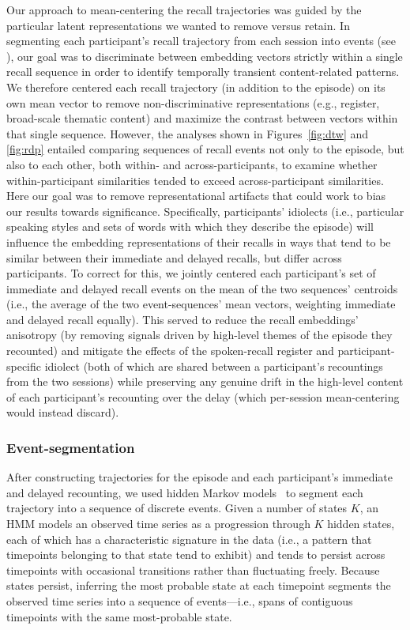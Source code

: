 \documentclass[10pt]{article}
\renewcommand{\nameref}[1]{\textit{\oldnameref{#1}}}
\begin{document}
Our approach to mean-centering the recall trajectories was guided by the particular latent representations we wanted to remove versus retain.
In segmenting each participant's recall trajectory from each session into events (see \nameref{subsec:eventseg}), our goal was to discriminate between embedding vectors strictly within a single recall sequence in order to identify temporally transient content-related patterns.
We therefore centered each recall trajectory (in addition to the episode) on its own mean vector to remove non-discriminative representations (e.g., register, broad-scale thematic content) and maximize the contrast between vectors within that single sequence.
However, the analyses shown in Figures~\ref{fig:dtw} and \ref{fig:rdp} entailed comparing sequences of recall events not only to the episode, but also to each other, both within- and across-participants, to examine whether within-participant similarities tended to exceed across-participant similarities. 
Here our goal was to remove representational artifacts that could work to bias our results towards significance.
Specifically, participants' idiolects (i.e., particular speaking styles and sets of words with which they describe the episode) will influence the embedding representations of their recalls in ways that tend to be similar between their immediate and delayed recalls, but differ across participants.
To correct for this, we jointly centered each participant's set of immediate and delayed recall events on the mean of the two sequences' centroids (i.e., the average of the two event-sequences' mean vectors, weighting immediate and delayed recall equally). 
This served to reduce the recall embeddings' anisotropy (by removing signals driven by high-level themes of the episode they recounted) and mitigate the effects of the spoken-recall register and participant-specific idiolect (both of which are shared between a participant's recountings from the two sessions) while preserving any genuine drift in the high-level content of each participant's recounting over the delay (which per-session mean-centering would instead discard).


\subsubsection*{Event-segmentation}\label{subsec:eventseg}

After constructing trajectories for the episode and each participant's immediate and delayed recounting, we used hidden Markov models~\citep[HMMs;][]{BaumPetr66,Rabi89} to segment each trajectory into a sequence of discrete events.
Given a number of states $K$, an HMM models an observed time series as a progression through $K$ hidden states, each of which has a characteristic signature in the data (i.e., a pattern that timepoints belonging to that state tend to exhibit) and tends to persist across timepoints with occasional transitions rather than fluctuating freely.
Because states persist, inferring the most probable state at each timepoint segments the observed time series into a sequence of events---i.e., spans of contiguous timepoints with the same most-probable state.
\end{document}
